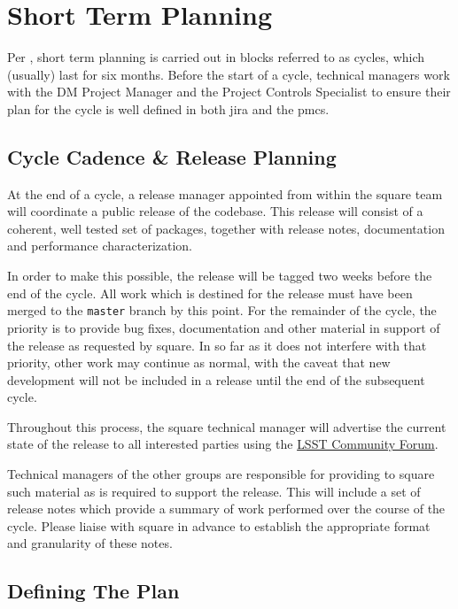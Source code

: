 \section{Short Term Planning}
\label{sec:cycle-plan}

Per , short term planning is carried out in blocks referred to as \glspl{cycle}, which (usually) last for six months.
Before the start of a \gls{cycle}, technical managers work with the DM Project Manager and the Project Controls Specialist to ensure their plan for the \gls{cycle} is well defined in both \gls{jira} and the \gls{pmcs}.

\subsection{Cycle Cadence \& Release Planning}
\label{sec:cycle-cadence}

At the end of a \gls{cycle}, a release manager appointed from within the \gls{square} team will coordinate a public release of the codebase.
This release will consist of a coherent, well tested set of packages, together with release notes, documentation and performance characterization.

In order to make this possible, the release will be tagged two weeks before the end of the \gls{cycle}.
All work which is destined for the release must have been merged to the \texttt{master} branch by this point.
For the remainder of the \gls{cycle}, the priority is to provide bug fixes, documentation and other material in support of the release as requested by \gls{square}.
In so far as it does not interfere with that priority, other work may continue as normal, with the caveat that new development will not be included in a release until the end of the subsequent \gls{cycle}.

Throughout this process, the \gls{square} technical manager will advertise the
current state of the release to all interested parties using the
\href{https://community.lsst.org/}{LSST Community Forum}.

Technical managers of the other groups are responsible for providing to \gls{square} such material as is required to support the release.
This will include a set of release notes which provide a summary of work performed over the course of the \gls{cycle}.
Please liaise with \gls{square} in advance to establish the appropriate format and granularity of these notes.

\subsection{Defining The Plan}\label{defining-the-plan}

